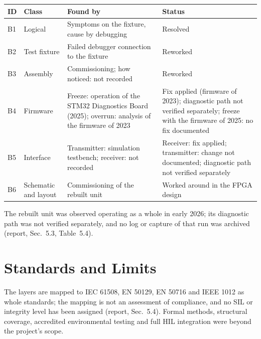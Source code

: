 \documentclass[a4paper,10pt]{article}
\begin{document}
\vspace{0.4ex}
\begin{center}
\scriptsize
\begin{tabular}{@{}l l L{5.4cm} L{6.2cm}@{}}
\toprule
\textbf{ID} & \textbf{Class} & \textbf{Found by} & \textbf{Status} \\
\midrule
B1 & Logical      & Symptoms on the fixture, cause by debugging & Resolved \\
B2 & Test fixture & Failed debugger connection to the fixture & Reworked \\
B3 & Assembly     & Commissioning; how noticed: not recorded & Reworked \\
B4 & Firmware     & Freeze: operation of the STM32 Diagnostics Board (2025); overrun: analysis of the firmware of 2023 & Fix applied (firmware of 2023); diagnostic path not verified separately; freeze with the firmware of 2025: no fix documented \\
B5 & Interface    & Transmitter: simulation testbench; receiver: not recorded & Receiver: fix applied; transmitter: change not documented; diagnostic path not verified separately \\
B6 & Schematic and layout & Commissioning of the rebuilt unit & Worked around in the FPGA design \\
\bottomrule
\end{tabular}
\end{center}
\vspace{0.3ex}

The rebuilt unit was observed operating as a whole in early 2026; its diagnostic path was not verified separately, and no log or capture of that run was archived (report, Sec.~5.3, Table~5.4).

\section{Standards and Limits}
The layers are mapped to IEC 61508, EN 50129, EN 50716 and IEEE 1012 as whole standards; the mapping is not an assessment of compliance, and no SIL or integrity level has been assigned (report, Sec.~5.4). Formal methods, structural coverage, accredited environmental testing and full HIL integration were beyond the project's scope.
\end{document}
